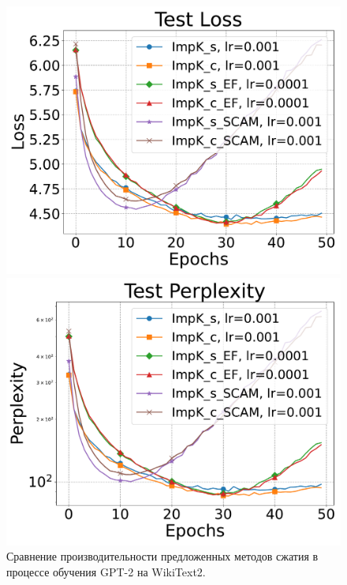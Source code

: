 \begin{figure}[ht]
        \begin{minipage}{0.45\textwidth}
            \includegraphics[width=\textwidth]{figures/gpt2/experiment1/Test Loss.pdf}
        \end{minipage}
        \begin{minipage}{0.45\textwidth}
            \includegraphics[width=\textwidth]{figures/gpt2/experiment1/Test Perplexity.pdf}
        \end{minipage}
        \caption{Сравнение производительности предложенных методов сжатия в процессе обучения GPT-2 на WikiText2.}
    \end{figure}

